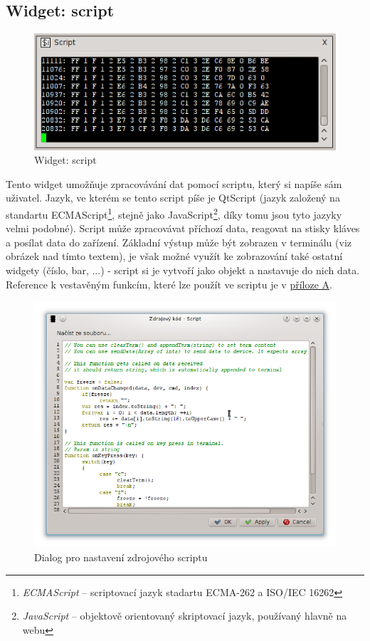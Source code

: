 \documentclass[12pt, a4paper, oneside]{article}
\newcommand{\It}{\textit}  %
\begin{document}
\subsection{Widget: script}
\begin{figure}[h]
\begin{center}
\includegraphics[scale=0.8]{img/w_script.png}
\caption{Widget: script}
\end{center}
\end{figure}
Tento widget umožňuje zpracovávání dat pomocí scriptu, který si napíše sám uživatel. Jazyk, ve kterém se tento script píše je QtScript (jazyk založený na standartu ECMAScript\footnote{\It{ECMAScript} -- scriptovací jazyk stadartu ECMA-262 a ISO/IEC 16262}, stejně jako JavaScript\footnote{\It{JavaScript} -- objektově orientovaný skriptovací jazyk, používaný hlavně na webu}, díky tomu jsou tyto jazyky velmi podobné). Script může zpracovávat příchozí data, reagovat na stisky kláves a posílat data do zařízení. Základní výstup může být zobrazen v terminálu (viz obrázek nad tímto textem), je však možné využít ke zobrazování také ostatní widgety (číslo, bar, ...) - script si je vytvoří jako objekt a nastavuje do nich data. Reference k vestavěným funkcím, které lze použít ve scriptu je v \hyperref[script_ref]{příloze A}.
\begin{figure}[h]
\begin{center}
\includegraphics[width=\textwidth]{img/w_script_src.png}
\caption{Dialog pro nastavení zdrojového scriptu}
\end{center}
\end{figure}
\end{document}
